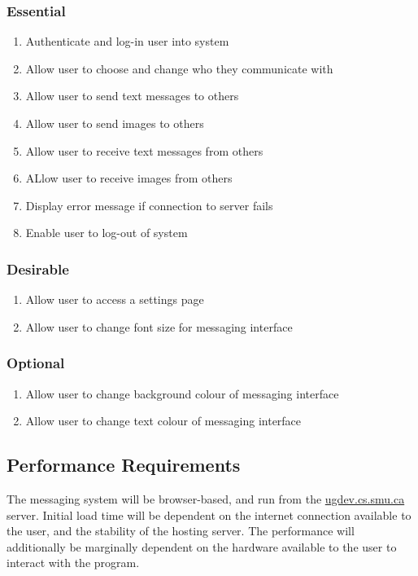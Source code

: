 \documentclass[11pt]{article}
\begin{document}
\subsubsection{Essential}
\begin{enumerate}
    \item Authenticate and log-in user into system
    \item Allow user to choose and change who they communicate with
    \item Allow user to send text messages to others
    \item Allow user to send images to others
    \item Allow user to receive text messages from others
    \item ALlow user to receive images from others
    \item Display error message if connection to server fails
    \item Enable user to log-out of system
\end{enumerate}

\subsubsection{Desirable}
\begin{enumerate}
    \item Allow user to access a settings page
    \item Allow user to change font size for messaging interface
\end{enumerate}

\subsubsection{Optional}
\begin{enumerate}
    \item Allow user to change background colour of messaging interface
    \item Allow user to change text colour of messaging interface
\end{enumerate}

\subsection{Performance Requirements}
The messaging system will be browser-based, and run from the \url{ugdev.cs.smu.ca} server. Initial
load time will be dependent on the internet connection available to the user, and the stability of
the hosting server. The performance will additionally be marginally dependent on the hardware
available to the user to interact with the program.
\end{document}
